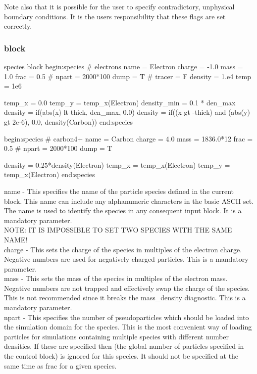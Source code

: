 Note also that it is possible for the user to specify contradictory,
unphysical boundary conditions. It is the users responsibility that these
flags are set correctly.

\subsubsection{ block}

\begin{lboxverbatim}{species block}
begin:species
   # electrons
   name = Electron
   charge = -1.0
   mass = 1.0
   frac = 0.5
   # npart = 2000*100
   dump = T
   # tracer = F
   density = 1.e4
   temp = 1e6

   temp_x = 0.0
   temp_y = temp_x(Electron)
   density_min = 0.1 * den_max
   density = if(abs(x) lt thick, den_max, 0.0)
   density = if((x gt -thick) and (abs(y) gt 2e-6), 0.0, density(Carbon))
end:species

begin:species
   # carbon4+
   name = Carbon
   charge = 4.0
   mass = 1836.0*12
   frac = 0.5
   # npart = 2000*100
   dump = T

   density = 0.25*density(Electron)
   temp_x = temp_x(Electron)
   temp_y = temp_x(Electron)
end:species
\end{lboxverbatim}

{\emphtext name} - This specifies the name of the particle species defined
in the current block. This name can include any alphanumeric characters in
the basic ASCII set. The name is used to identify the species in any
consequent input block. It is a mandatory parameter.\\

{\emphtext NOTE: IT IS IMPOSSIBLE TO SET TWO SPECIES WITH THE SAME NAME!} \\

{\emphtext charge} - This sets the charge of the species in
multiples of the electron charge. Negative numbers are used for negatively
charged particles. This is a mandatory parameter.\\

{\emphtext mass} - This sets the mass of the species in multiples
of the electron mass. Negative numbers are not trapped and effectively swap the
charge of the species. This is not recommended since it breaks the
mass\_density diagnostic. This is a mandatory parameter.\\

{\emphtext npart} - This specifies the number of pseudoparticles
which should be loaded into the simulation domain for the species. This is the
most convenient way of loading particles for simulations containing multiple
species with different number densities. If these are specified then
 (the global number of particles specified in the control
block) is ignored for this species. It should not be specified at the same time
as frac for a given species.\\

